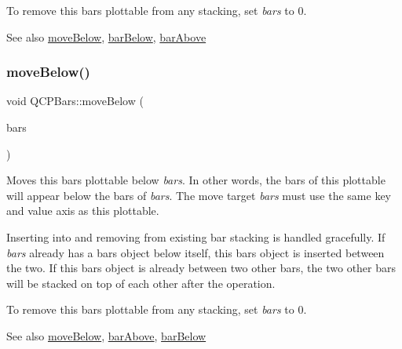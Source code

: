 To remove this bars plottable from any stacking, set {\itshape bars} to 0.

\begin{DoxySeeAlso}{See also}
\mbox{\hyperlink{class_q_c_p_bars_a69fc371346980f19177c3d1ecdad78ee}{move\+Below}}, \mbox{\hyperlink{class_q_c_p_bars_a1b58664864b141f45e02044a855b3213}{bar\+Below}}, \mbox{\hyperlink{class_q_c_p_bars_ab97f2acd9f6cb40d2cc3c33d278f0e78}{bar\+Above}} 
\end{DoxySeeAlso}
\mbox{\label{class_q_c_p_bars_a69fc371346980f19177c3d1ecdad78ee}} 
\subsubsection{\texorpdfstring{move\+Below()}{moveBelow()}}
{\footnotesize\ttfamily void Q\+C\+P\+Bars\+::move\+Below (\begin{DoxyParamCaption}\item[{\mbox{\hyperlink{class_q_c_p_bars}{Q\+C\+P\+Bars}} $\ast$}]{bars }\end{DoxyParamCaption})}

Moves this bars plottable below {\itshape bars}. In other words, the bars of this plottable will appear below the bars of {\itshape bars}. The move target {\itshape bars} must use the same key and value axis as this plottable.

Inserting into and removing from existing bar stacking is handled gracefully. If {\itshape bars} already has a bars object below itself, this bars object is inserted between the two. If this bars object is already between two other bars, the two other bars will be stacked on top of each other after the operation.

To remove this bars plottable from any stacking, set {\itshape bars} to 0.

\begin{DoxySeeAlso}{See also}
\mbox{\hyperlink{class_q_c_p_bars_a69fc371346980f19177c3d1ecdad78ee}{move\+Below}}, \mbox{\hyperlink{class_q_c_p_bars_ab97f2acd9f6cb40d2cc3c33d278f0e78}{bar\+Above}}, \mbox{\hyperlink{class_q_c_p_bars_a1b58664864b141f45e02044a855b3213}{bar\+Below}} 
\end{DoxySeeAlso}
\mbox{\label{class_q_c_p_bars_a121f899c27af3186fe93dcd0eb98f49b}} 
